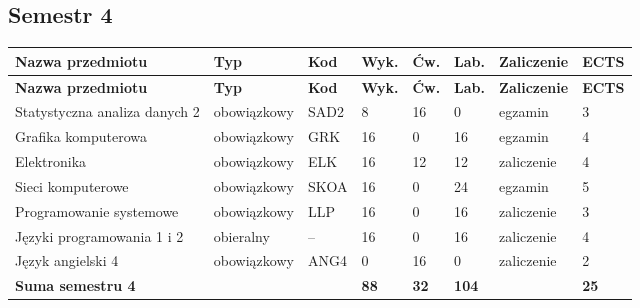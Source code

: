 \documentclass[12pt,a4paper]{article}
\newcommand{\thdrule}{\noalign{\global\setlength{\extrarowheight}{0pt}}}
\newcommand{\thdend}{\noalign{\global\setlength{\extrarowheight}{4pt}}}
\begin{document}
\subsection*{Semestr 4}

{\scriptsize
\begin{longtable}{m{5.0cm}m{1.9cm}m{0.75cm}m{0.85cm}m{0.85cm}m{0.85cm}m{1.45cm}m{0.9cm}}
\thdrule\toprule
\rowcolor{pjatkRed}
{\color{white}\footnotesize\textbf{\vphantom{Ag}Nazwa przedmiotu}} & {\color{white}\footnotesize\textbf{\vphantom{Ag}Typ}} & {\color{white}\footnotesize\textbf{\vphantom{Ag}Kod}} & {\color{white}\footnotesize\textbf{\vphantom{Ag}Wyk.}} & {\color{white}\footnotesize\textbf{\vphantom{Ag}Ćw.}} & {\color{white}\footnotesize\textbf{\vphantom{Ag}Lab.}} & {\color{white}\footnotesize\textbf{\vphantom{Ag}Zaliczenie}} & {\color{white}\footnotesize\textbf{\vphantom{Ag}ECTS}} \\
\midrule\thdend
\endfirsthead
\thdrule\toprule
\rowcolor{pjatkRed}
{\color{white}\footnotesize\textbf{\vphantom{Ag}Nazwa przedmiotu}} & {\color{white}\footnotesize\textbf{\vphantom{Ag}Typ}} & {\color{white}\footnotesize\textbf{\vphantom{Ag}Kod}} & {\color{white}\footnotesize\textbf{\vphantom{Ag}Wyk.}} & {\color{white}\footnotesize\textbf{\vphantom{Ag}Ćw.}} & {\color{white}\footnotesize\textbf{\vphantom{Ag}Lab.}} & {\color{white}\footnotesize\textbf{\vphantom{Ag}Zaliczenie}} & {\color{white}\footnotesize\textbf{\vphantom{Ag}ECTS}} \\
\midrule\thdend
\endhead
\rowcolor{tableRowLight} Statystyczna analiza danych 2 & {\scriptsize obowiązkowy} & SAD2 & 8 & 16 & 0 & {\scriptsize egzamin} & 3 \\
\rowcolor{tableRowAlt} Grafika komputerowa & {\scriptsize obowiązkowy} & GRK & 16 & 0 & 16 & {\scriptsize egzamin} & 4 \\
\rowcolor{tableRowLight} Elektronika & {\scriptsize obowiązkowy} & ELK & 16 & 12 & 12 & {\scriptsize zaliczenie} & 4 \\
\rowcolor{tableRowAlt} Sieci komputerowe & {\scriptsize obowiązkowy} & SKOA & 16 & 0 & 24 & {\scriptsize egzamin} & 5 \\
\rowcolor{tableRowLight} Programowanie systemowe & {\scriptsize obowiązkowy} & LLP & 16 & 0 & 16 & {\scriptsize zaliczenie} & 3 \\
\rowcolor{tableElective} Języki programowania 1 i 2 & {\scriptsize obieralny} & -- & 16 & 0 & 16 & {\scriptsize zaliczenie} & 4 \\
\rowcolor{tableRowAlt} Język angielski 4 & {\scriptsize obowiązkowy} & ANG4 & 0 & 16 & 0 & {\scriptsize zaliczenie} & 2 \\
\midrule[\heavyrulewidth]
\rowcolor{tableSummary} \textbf{Suma semestru 4} & & & \textbf{88} & \textbf{32} & \textbf{104} & & \textbf{25} \\
\bottomrule
\end{longtable}}
\end{document}
